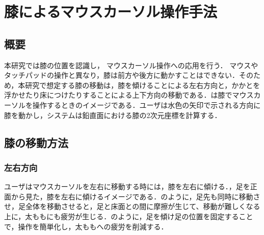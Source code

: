 \chapter{膝によるマウスカーソル操作手法}
\section{概要}
本研究では膝の位置を認識し，
マウスカーソル操作への応用を行う．
マウスやタッチパッドの操作と異なり，膝は前方や後方に動かすことはできない．そのため，本研究で想定する膝の移動は，膝を傾けることによる左右方向と，かかとを浮かせたり床につけたりすることによる上下方向の移動である．は膝でマウスカーソルを操作するときのイメージである．ユーザは水色の矢印で示される方向に膝を動かし，システムは鉛直面における膝の2次元座標を計算する．

\section{膝の移動方法}
\subsection{左右方向}
ユーザはマウスカーソルを左右に移動する時には，膝を左右に傾ける．，足を正面から見た，膝を左右に傾けるイメージである．のように，足先も同時に移動させ，足全体を移動させると，足と床面との間に摩擦が生じて、移動が難しくなる上に，太ももにも疲労が生じる．のように，足を傾け足の位置を固定することで，操作を簡単化し，太ももへの疲労を削減する．


